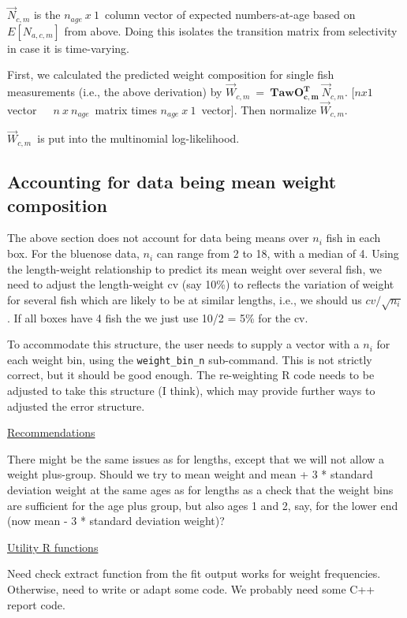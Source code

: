 \documentclass[a4paper,11pt,twoside,pdftex,draft]{article}
\begin{document}
$\overrightarrow N_{c,m}$ is the $n_{age}\ x\ 1$\ column vector of expected numbers-at-age based on $E[N_{a,c,m}]$ from above. Doing this isolates the transition matrix from selectivity in case it is time-varying.

First, we calculated the predicted weight composition for single fish measurements (i.e., the above derivation) by $\overrightarrow W_{c,m}\ =\ \mathbf{TawO_{c,m}^T}\ \overrightarrow N_{c,m}$.
[$nx1$ vector\ \ \ $n\ x\ n_{age}$\ matrix times $n_{age}\ x\ 1$\ vector]. Then normalize $\overrightarrow W_{c,m}$.

$\overrightarrow W_{c,m}$\ is put into the multinomial log-likelihood. 

\subsection{Accounting for data being mean weight composition}
The above section does not account for data being means over $n_i$ fish in each box. For the bluenose data, $n_i$ can range from 2 to 18, with a median of 4. 
Using the length-weight relationship to predict its mean weight over several fish, we need to adjust the 
 length-weight cv (say 10\%) to reflects the variation of weight for several fish which are likely to be at similar lengths, i.e., we should us $cv/\sqrt{n_{i}}$. If all boxes have 4 fish the we just use 10/2 = 5\% for the cv.

To accommodate this structure, the user needs to supply a vector with a $n_i$ for each weight bin, using the \texttt{weight\_bin\_n} sub-command. This is not strictly correct, but it should be good enough. The re-weighting R code needs to be adjusted to take this structure (I think), which may provide further ways to adjusted the error structure.



\bigskip
\underline{Recommendations}

There might be the same issues as for lengths, except that we will not allow a weight plus-group. Should we try to mean weight and mean + 3 * standard deviation weight at the same ages as for lengths as a check that the weight bins are sufficient for the age plus group, but also ages 1 and 2, say, for the lower end (now mean - 3 * standard deviation weight)?

\bigskip
\underline{Utility R functions}

Need check extract function from the fit output works for weight frequencies. Otherwise, need to write or adapt some code. 
We probably need some C++ report code. 
\end{document}
